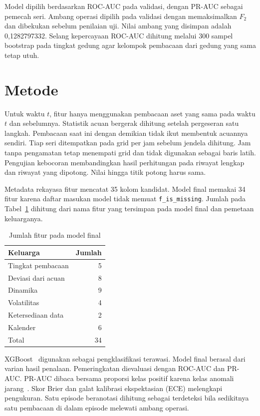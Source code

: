 \documentclass[conference]{IEEEtran}
\begin{document}
Model dipilih berdasarkan ROC-AUC pada validasi, dengan PR-AUC sebagai pemecah seri. Ambang operasi dipilih pada validasi dengan memaksimalkan $F_2$ dan dibekukan sebelum penilaian uji. Nilai ambang yang disimpan adalah 0,1282797332. Selang kepercayaan ROC-AUC dihitung melalui 300 sampel bootstrap pada tingkat gedung agar kelompok pembacaan dari gedung yang sama tetap utuh.

\section{Metode}
Untuk waktu $t$, fitur hanya menggunakan pembacaan aset yang sama pada waktu $t$ dan sebelumnya. Statistik acuan bergerak dihitung setelah pergeseran satu langkah. Pembacaan saat ini dengan demikian tidak ikut membentuk acuannya sendiri. Tiap seri ditempatkan pada grid per jam sebelum jendela dihitung. Jam tanpa pengamatan tetap menempati grid dan tidak digunakan sebagai baris latih. Pengujian kebocoran membandingkan hasil perhitungan pada riwayat lengkap dan riwayat yang dipotong. Nilai hingga titik potong harus sama.

Metadata rekayasa fitur mencatat 35 kolom kandidat. Model final memakai 34 fitur karena daftar masukan model tidak memuat \texttt{f\_is\_missing}. Jumlah pada Tabel~\ref{tab:fitur} dihitung dari nama fitur yang tersimpan pada model final dan pemetaan keluarganya.

\begin{table}[!t]
\centering
\caption{Jumlah fitur pada model final}
\label{tab:fitur}
\begin{tabular}{lr}
\toprule
Keluarga & Jumlah \\
\midrule
Tingkat pembacaan & 5 \\
Deviasi dari acuan & 8 \\
Dinamika & 9 \\
Volatilitas & 4 \\
Ketersediaan data & 2 \\
Kalender & 6 \\
\midrule
Total & 34 \\
\bottomrule
\end{tabular}
\end{table}

XGBoost~\cite{xgb} digunakan sebagai pengklasifikasi terawasi. Model final berasal dari varian hasil penalaan. Pemeringkatan dievaluasi dengan ROC-AUC dan PR-AUC. PR-AUC dibaca bersama proporsi kelas positif karena kelas anomali jarang~\cite{saito}. Skor Brier dan galat kalibrasi ekspektasian (ECE) melengkapi pengukuran. Satu episode beranotasi dihitung sebagai terdeteksi bila sedikitnya satu pembacaan di dalam episode melewati ambang operasi.
\end{document}
